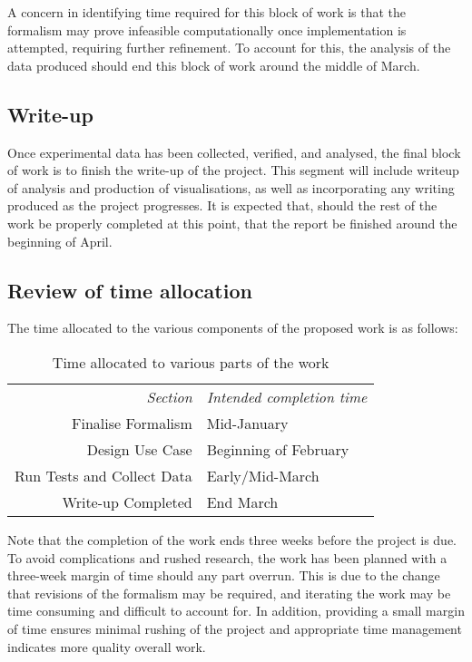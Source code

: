 A concern in identifying time required for this block of work is that the formalism may prove infeasible computationally once implementation is attempted, requiring further refinement. To account for this, the analysis of the data produced should end this block of work around the middle of March.\par

\subsection{Write-up}
Once experimental data has been collected, verified, and analysed, the final block of work is to finish the write-up of the project. This segment will include writeup of analysis and production of visualisations, as well as incorporating any writing produced as the project progresses. It is expected that, should the rest of the work be properly completed at this point, that the report be finished around the beginning of April.\par

\subsection{Review of time allocation}
The time allocated to the various components of the proposed work is as follows:\\

\begin{table}
\begin{center}
\begin{tabular}{r|l}
    \emph{Section} & \emph{Intended completion time}\\
    Finalise Formalism & Mid-January\\
    Design Use Case & Beginning of February\\
    Run Tests and Collect Data & Early/Mid-March\\
    Write-up Completed & End March\\
\end{tabular}\par
    \caption{Time allocated to various parts of the work}
\end{center}
\end{table}

Note that the completion of the work ends three weeks before the project is due. To avoid complications and rushed research, the work has been planned with a three-week margin of time should any part overrun. This is due to the change that revisions of the formalism may be required, and iterating the work may be time consuming and difficult to account for. In addition, providing a small margin of time ensures minimal rushing of the project and appropriate time management indicates more quality overall work.\par
